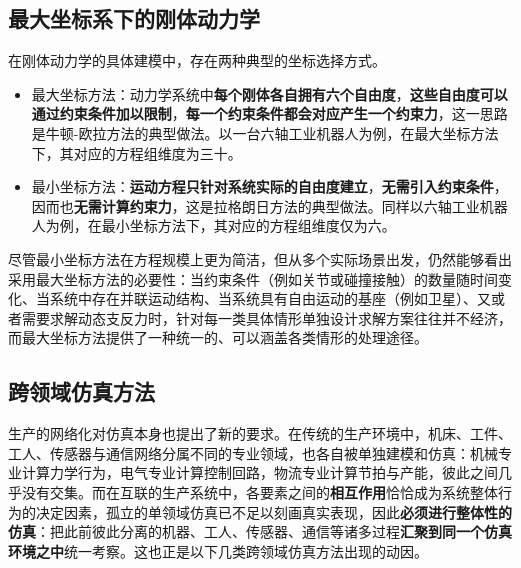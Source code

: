 \subsection{最大坐标系下的刚体动力学}

在刚体动力学的具体建模中，存在两种典型的坐标选择方式。
\begin{itemize}
  \item 最大坐标方法：动力学系统中\textbf{每个刚体各自拥有六个自由度}，\textbf{这些自由度可以通过约束条件加以限制}，\textbf{每一个约束条件都会对应产生一个约束力}，这一思路是牛顿-欧拉方法的典型做法。以一台六轴工业机器人为例，在最大坐标方法下，其对应的方程组维度为三十。
  \item 最小坐标方法：\textbf{运动方程只针对系统实际的自由度建立}，\textbf{无需引入约束条件}，因而也\textbf{无需计算约束力}，这是拉格朗日方法的典型做法。同样以六轴工业机器人为例，在最小坐标方法下，其对应的方程组维度仅为六。
\end{itemize}

尽管最小坐标方法在方程规模上更为简洁，但从多个实际场景出发，仍然能够看出采用最大坐标方法的必要性：当约束条件（例如关节或碰撞接触）的数量随时间变化、当系统中存在并联运动结构、当系统具有自由运动的基座（例如卫星）、又或者需要求解动态支反力时，针对每一类具体情形单独设计求解方案往往并不经济，而最大坐标方法提供了一种统一的、可以涵盖各类情形的处理途径。


\subsection{跨领域仿真方法}

生产的网络化对仿真本身也提出了新的要求。在传统的生产环境中，机床、工件、工人、传感器与通信网络分属不同的专业领域，也各自被单独建模和仿真：机械专业计算力学行为，电气专业计算控制回路，物流专业计算节拍与产能，彼此之间几乎没有交集。而在互联的生产系统中，各要素之间的\textbf{相互作用}恰恰成为系统整体行为的决定因素，孤立的单领域仿真已不足以刻画真实表现，因此\textbf{必须进行整体性的仿真}：把此前彼此分离的机器、工人、传感器、通信等诸多过程\textbf{汇聚到同一个仿真环境之中}统一考察。这也正是以下几类跨领域仿真方法出现的动因。

